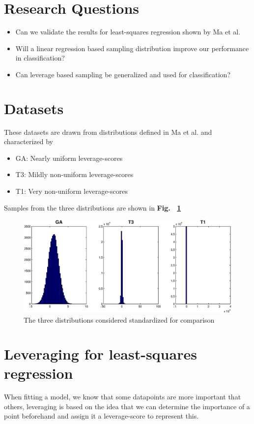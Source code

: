 \documentclass{article}
\begin{document}
\section{Research Questions}
\begin{itemize}
	\item Can we validate the results for least-squares regression shown by Ma et al. \cite{Ma}
	\item Will a linear regression based sampling distribution improve our performance in classification?
	\item Can leverage based sampling be generalized and used for classification?
\end{itemize}

\section{Datasets}
These datasets are drawn from distributions defined in Ma et al. \cite{Ma} and characterized by
\begin{itemize}
	\item GA: Nearly uniform leverage-scores
	\item T3: Mildly non-uniform leverage-scores
	\item T1: Very non-uniform leverage-scores
\end{itemize}  
Samples from the three distributions are shown in {\bf Fig.~ \ref{fig:datasets}}

\begin{figure}[t]
\centering
\includegraphics[width=\linewidth]{images/Data_distributions}
\caption{The three distributions considered standardized for comparison}
\label{fig:datasets}
\end{figure}
%

\section{Leveraging for least-squares regression}
When fitting a model, we know that some datapoints are more important that others, leveraging is based on the idea that we can determine the importance of a point beforehand and assign it a leverage-score to represent this.
\end{document}
